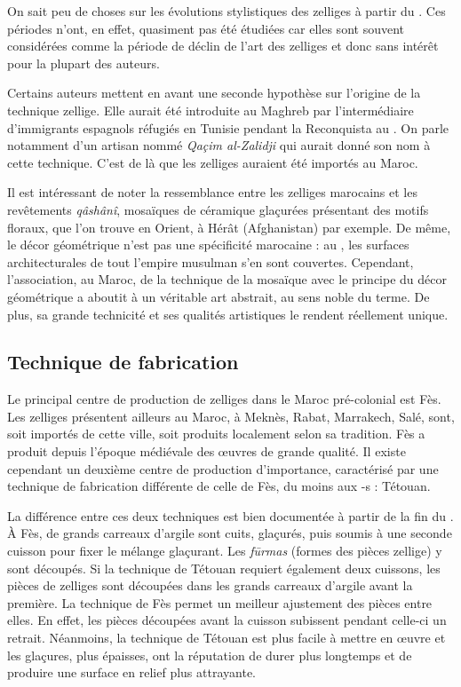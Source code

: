On sait peu de choses sur les évolutions stylistiques des zelliges 
à partir du . Ces périodes n'ont, en effet, quasiment
pas été étudiées car elles sont souvent considérées comme la période 
de déclin de l'art des zelliges et donc sans intérêt pour la plupart 
des auteurs.

Certains auteurs \autocite{Castera_1996, Soustiel_1985} mettent en 
avant une seconde hypothèse sur l'origine de la technique zellige. 
Elle aurait été introduite au Maghreb par l'intermédiaire 
d'immigrants espagnols réfugiés en Tunisie pendant la Reconquista 
au . On parle notamment d'un artisan nommé \emph{Qaçim
al-Zalidji} qui aurait donné son nom à cette technique. C'est de là 
que les zelliges auraient été importés au Maroc.

Il est intéressant de noter la ressemblance entre les zelliges 
marocains et les revêtements \emph{qâshânî}, mosaïques de céramique 
glaçurées présentant des motifs floraux, que l'on trouve en Orient, 
à Hérât (Afghanistan) par exemple. De même, le décor géométrique 
n'est pas une spécificité marocaine : au , les surfaces 
architecturales de tout l'empire musulman s'en sont couvertes. 
Cependant, l'association, au Maroc, de la technique de la mosaïque 
avec le principe du décor géométrique a aboutit à un véritable art 
abstrait, au sens noble du terme. De plus, sa grande technicité et 
ses qualités artistiques le rendent réellement unique.

\subsection{Technique de fabrication}
Le principal centre de production de zelliges dans le Maroc 
pré-colonial est Fès. Les zelliges présentent ailleurs au Maroc, 
à Meknès, Rabat, Marrakech, Salé, sont, soit importés de cette ville, 
soit produits localement selon sa tradition. Fès a produit depuis 
l'époque médiévale des {\oe}uvres de grande qualité. Il existe 
cependant un deuxième centre de production d'importance, caractérisé 
par une technique de fabrication différente de celle de Fès, du moins 
aux -s : Tétouan.

La différence entre ces deux techniques est bien documentée à partir 
de la fin du . À Fès, de grands carreaux d'argile sont 
cuits, glaçurés, puis soumis à une seconde cuisson pour fixer le 
mélange glaçurant. Les \emph{f\=urmas} (formes des pièces zellige) 
y sont découpés. Si la technique de Tétouan requiert également deux 
cuissons, les pièces de zelliges sont découpées dans les grands 
carreaux d'argile avant la première. La technique de Fès permet un 
meilleur ajustement des pièces entre elles. En effet, les pièces 
découpées avant la cuisson subissent pendant celle-ci un retrait. 
Néanmoins, la technique de Tétouan est plus facile à mettre en 
{\oe}uvre et les glaçures, plus épaisses, ont la réputation de durer 
plus longtemps et de produire une surface en relief plus attrayante.

